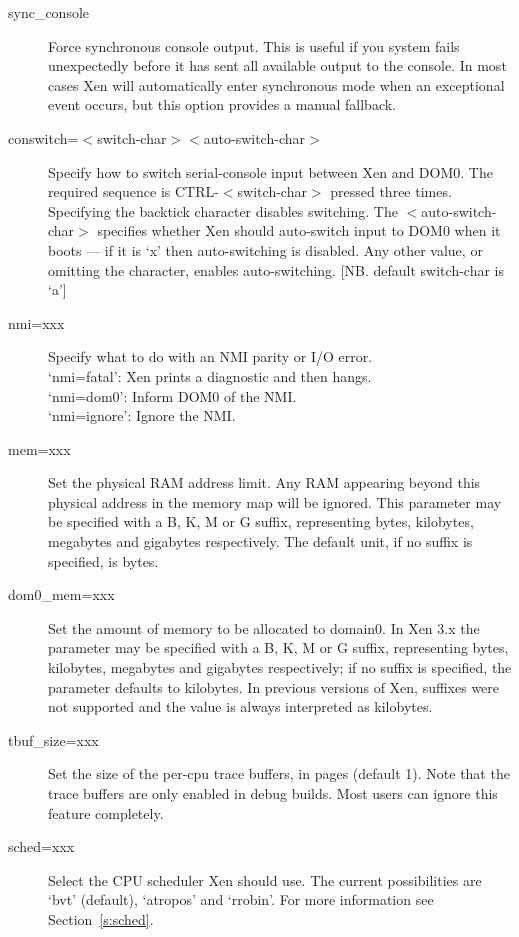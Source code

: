 \documentclass[11pt,twoside,final,openright]{report}
\begin{document}
{\begin{description}
\item [sync\_console ]
 Force synchronous console output. This is useful if you system fails
 unexpectedly before it has sent all available output to the
 console. In most cases Xen will automatically enter synchronous mode
 when an exceptional event occurs, but this option provides a manual
 fallback.

\item [conswitch=$<$switch-char$><$auto-switch-char$>$ ] 
 Specify how to switch serial-console input between
 Xen and DOM0. The required sequence is CTRL-$<$switch-char$>$
 pressed three times. Specifying the backtick character 
 disables switching.
 The $<$auto-switch-char$>$ specifies whether Xen should
 auto-switch input to DOM0 when it boots --- if it is `x'
 then auto-switching is disabled.  Any other value, or
 omitting the character, enables auto-switching.
 [NB. default switch-char is `a'] 

\item [nmi=xxx ] 
 Specify what to do with an NMI parity or I/O error. \\
 `nmi=fatal':  Xen prints a diagnostic and then hangs. \\
 `nmi=dom0':   Inform DOM0 of the NMI. \\
 `nmi=ignore': Ignore the NMI. 

\item [mem=xxx ]
 Set the physical RAM address limit. Any RAM appearing beyond this
 physical address in the memory map will be ignored. This parameter
 may be specified with a B, K, M or G suffix, representing bytes,
 kilobytes, megabytes and gigabytes respectively. The
 default unit, if no suffix is specified, is bytes.

\item [dom0\_mem=xxx ] 
 Set the amount of memory to be allocated to domain0. In Xen 3.x the parameter
 may be specified with a B, K, M or G suffix, representing bytes,
 kilobytes, megabytes and gigabytes respectively; if no suffix is specified, 
 the parameter defaults to kilobytes. In previous versions of Xen, suffixes
 were not supported and the value is always interpreted as kilobytes. 

\item [tbuf\_size=xxx ] 
 Set the size of the per-cpu trace buffers, in pages
 (default 1).  Note that the trace buffers are only
 enabled in debug builds.  Most users can ignore
 this feature completely. 

\item [sched=xxx ] 
 Select the CPU scheduler Xen should use.  The current
 possibilities are `bvt' (default), `atropos' and `rrobin'. 
 For more information see Section~\ref{s:sched}. 


\end{description}}
\end{document}
